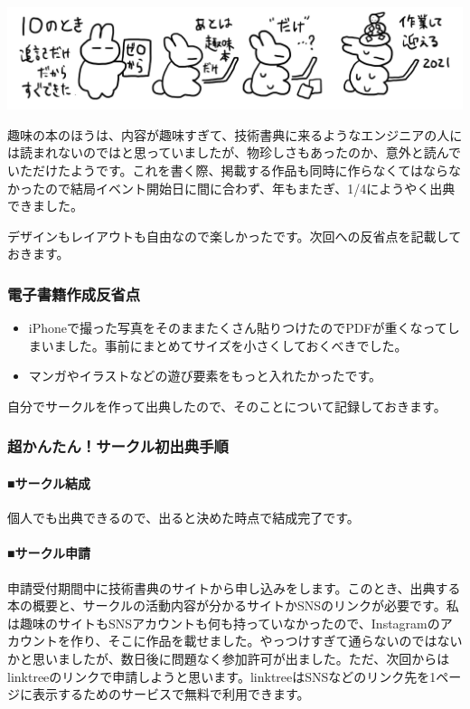 \documentclass[dvipdfmx,autodetect-engine,10pt,b5paper,papersize,openany,dvipsnames]{jsbook}
\begin{document}
\includegraphics[width=\textwidth]{images/202101/newsletter20210218_2.png}


\begin{multicols}{2}
趣味の本のほうは、内容が趣味すぎて、技術書典に来るようなエンジニアの人には読まれないのではと思っていましたが、物珍しさもあったのか、意外と読んでいただけたようです。これを書く際、掲載する作品も同時に作らなくてはならなかったので結局イベント開始日に間に合わず、年もまたぎ、1/4にようやく出典できました。

デザインもレイアウトも自由なので楽しかったです。次回への反省点を記載しておきます。

\subsubsection*{電子書籍作成反省点}

\begin{itemize}
\item iPhoneで撮った写真をそのままたくさん貼りつけたのでPDFが重くなってしまいました。事前にまとめてサイズを小さくしておくべきでした。
\item マンガやイラストなどの遊び要素をもっと入れたかったです。
\end{itemize}


自分でサークルを作って出典したので、そのことについて記録しておきます。

\subsubsection*{超かんたん！サークル初出典手順}

\paragraph{\gtfamily\bfseries ■サークル結成}

個人でも出典できるので、出ると決めた時点で結成完了です。

\paragraph{\gtfamily\bfseries ■サークル申請}

申請受付期間中に技術書典のサイトから申し込みをします。このとき、出典する本の概要と、サークルの活動内容が分かるサイトかSNSのリンクが必要です。私は趣味のサイトもSNSアカウントも何も持っていなかったので、Instagramのアカウントを作り、そこに作品を載せました。やっつけすぎて通らないのではないかと思いましたが、数日後に問題なく参加許可が出ました。ただ、次回からはlinktreeのリンクで申請しようと思います。linktreeはSNSなどのリンク先を1ページに表示するためのサービスで無料で利用できます。


\end{multicols}
\end{document}
